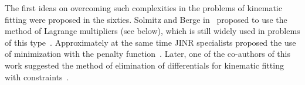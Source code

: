 
The first ideas on overcoming such complexities in the problems of kinematic fitting were proposed in the sixties.
Solmitz and Berge in~\cite{b1} proposed to use the method of Lagrange multipliers (see below), which is still widely used in problems of this type~\cite{b4}. %
Approximately at the same time JINR specialists proposed the use of minimization with the penalty function~\cite{b5}.%
Later, one of the co-authors of this work suggested the method of elimination of differentials for kinematic fitting with constraints~\cite{b6}.
